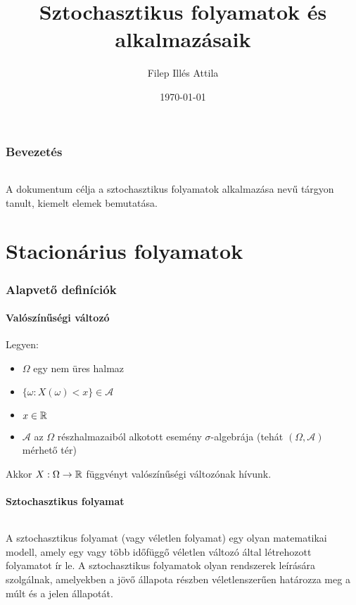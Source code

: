 \documentclass[11pt,a4paper]{article}
\title{Sztochasztikus folyamatok és alkalmazásaik}
\date{\today}
\author{Filep Illés Attila}
\begin{document}
 	\maketitle
  	\newpage

	\begin{abstract}

	\end{abstract}
	\tableofcontents
	\section*{Bevezetés}
		\paragraph{}
			A dokumentum célja a sztochasztikus folyamatok alkalmazása nevű tárgyon tanult, kiemelt elemek bemutatása.
	\part{Stacionárius folyamatok}
		\section{Alapvető definíciók}
			\subsection{Valószínűségi változó}
				Legyen:
				\begin{itemize}
					\item $\Omega$ egy nem üres halmaz
					\item $\{\omega : X(\omega) < x\} \in \mathcal{A}$
					\item $x \in \Bbb{R}$
					\item $\mathcal{A}$ az $\Omega$ részhalmazaiból alkotott esemény $\sigma$-algebrája (tehát $(\Omega, \mathcal{A})$ mérhető tér)
				\end{itemize}
				Akkor $X: \Omega \to \Bbb{R}$ függvényt valószínűségi változónak hívunk.
			\subsection{Sztochasztikus folyamat}
				\paragraph{}
					A sztochasztikus folyamat (vagy véletlen folyamat) egy olyan matematikai modell, amely egy vagy több időfüggő véletlen változó által létrehozott folyamatot ír le. A sztochasztikus folyamatok olyan rendszerek leírására szolgálnak, amelyekben a jövő állapota részben véletlenszerűen határozza meg a múlt és a jelen állapotát.
\end{document}
